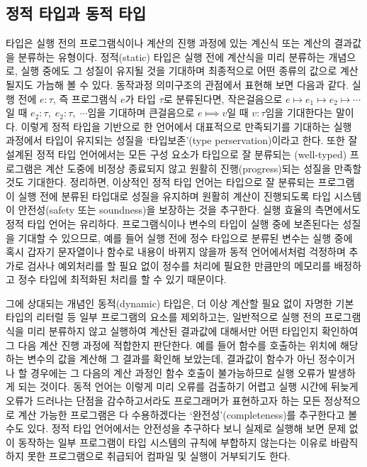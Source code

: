 \subsection{정적 타입과 동적 타입}
타입은 실행 전의 프로그램식이나 계산의 진행 과정에 있는 계신식
또는 계산의 결과값을 분류하는 유형이다. 정적(static) 타입은 실행 전에
계산식을 미리 분류하는 개념으로, 실행 중에도 그 성질이 유지될 것을
기대하며 최종적으로 어떤 종류의 값으로 계산될지도 가늠해 볼 수 있다.
동작과정 의미구조의 관점에서 표현해 보면 다음과 같다. 실행 전에 $e:\tau$,
즉 프로그램식 $e$가 타입 $\tau$로 분류된다면, 작은걸음으로
$e\longmapsto e_1\longmapsto e_2\longmapsto\cdots$일 때
$e_2:\tau,\;e_2:\tau,\;\cdots$임을 기대하며 큰걸음으로
$e\Longmapsto v$일 때 $v:\tau$임을 기대한다는 말이다.
이렇게 정적 타입을 기반으로 한 언어에서 대표적으로 만족되기를
기대하는 실행 과정에서 타입이 유지되는 성질을
`타입보존'(type perservation)이라고 한다. 또한 잘 설계된 정적
타입 언어에서는 모든 구성 요소가 타입으로 잘 분류되는 (well-typed)
프로그램은 계산 도중에 비정상 종료되지 않고 원활히 진행(progress)되는
성질을 만족할 것도 기대한다. 정리하면, 이상적인 정적 타입 언어는
타입으로 잘 분류되는 프로그램이 실행 전에 분류된 타입대로 성질을 유지하며
원활히 계산이 진행되도록 타입 시스템이 안전성(safety 또는 soundness)을
보장하는 것을 추구한다. 실행 효율의 측면에서도 정적 타입 언어는
유리하다. 프로그램식이나 변수의 타입이 실행 중에 보존된다는 성질을
기대할 수 있으므로, 예를 들어 실행 전에 정수 타입으로 분류된 변수는
실행 중에 혹시 갑자기 문자열이나 함수로 내용이 바뀌지 않을까
동적 언어에서처럼 걱정하며 추가로 검사나 예외처리를 할 필요 없이
정수를 처리에 필요한 만큼만의 메모리를 배정하고 정수 타입에
최적화된 처리를 할 수 있기 때문이다.

그에 상대되는 개념인 동적(dynamic) 타입은, 더 이상 계산할 필요 없이
자명한 기본타입의 리터럴 등 일부 프로그램의 요소를 제외하고는,
일반적으로 실행 전의 프로그램식을 미리 분류하지 않고 실행하여 계산된
결과값에 대해서만 어떤 타입인지 확인하여 그 다음 계산 진행 과정에
적합한지 판단한다. 예를 들어 함수를 호출하는 위치에 해당하는 변수의
값을 계산해 그 결과를 확인해 보았는데, 결과값이 함수가 아닌 정수이거나
할 경우에는 그 다음의 계산 과정인 함수 호출이 불가능하므로 실행 오류가
발생하게 되는 것이다. 동적 언어는 이렇게 미리 오류를 검출하기 어렵고
실행 시간에 뒤늦게 오류가 드러나는 단점을 감수하고서라도 프로그래머가
표현하고자 하는 모든 정상적으로 계산 가능한 프로그램은 다 수용하겠다는
`완전성'(completeness)를 추구한다고 볼 수도 있다. 정적 타입 언어에서는
안전성을 추구하다 보니 실제로 실행해 보면 문제 없이 동작하는
일부 프로그램이 타입 시스템의 규칙에 부합하지 않는다는 이유로
바람직하지 못한 프로그램으로 취급되어 컴파일 및 실행이 거부되기도 한다.


